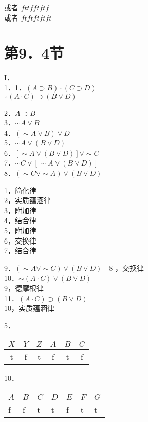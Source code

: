 或者 $f t t f f t f t f$\\
或者 $f t f t f t f t f t$

\section*{第9．4节}
I．\\
1．1．$(A \supset B) \cdot(C \supset D)$\\
$\therefore(A \cdot C) \supset(B \vee D)$

2．$A \supset B$\\
3．$\sim A \vee B$\\
4．$(\sim A \vee B) \vee D$\\
5．$\sim A \vee(B \vee D)$\\
6．$[\sim A \vee(B \vee D)] \vee \sim C$\\
7．$\sim C \vee[\sim A \vee(B \vee D)]$\\
8．$(\sim C \vee \sim A) \vee(B \vee D)$

1，简化律\\
2，实质蕴涵律\\
3，附加律\\
4，结合律\\
5，附加律\\
6，交换律\\
7，结合律

9．$(\sim A \vee \sim C) \vee(B \vee D) \quad 8$ ，交换律\\
10．$\sim(A \cdot C) \vee(B \vee D)$\\
9，德摩根律\\
11．$(A \cdot C) \supset(B \vee D)$\\
10，实质蕴涵律

5． \begin{tabular}{cccccc}
$X$ & $Y$ & $Z$ & $A$ & $B$ & $C$ \\
\hline
t & f & t & f & t & f \\
\hline
\end{tabular}

10． \begin{tabular}{lllllll}
$A$ & $B$ & $C$ & $D$ & $E$ & $F$ & $G$ \\
\hline
f & f & t & t & f & t & t \\
\hline
\end{tabular}

